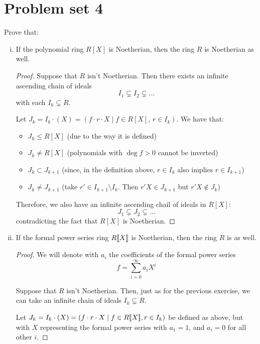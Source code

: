 \section*{Problem set 4}

\begin{problem}
Prove that:
\begin{enumerate}[(i)]
    \item If the polynomial ring \(R[X]\) is Noetherian, then the ring \(R\) is Noetherian as well.
    \begin{proof}
    Suppose that \(R\) isn't Noetherian. Then there exists an infinite ascending chain of ideals
    \[
        I_1 \subsetneq I_2 \subsetneq \dots
    \]
    with each \(I_k \subsetneq R\).
    
    Let \(J_k = I_k \cdot (X) = \left(f \cdot r \cdot X \mid f \in R[X], \, r \in I_k\right)\). We have that:
    \begin{itemize}
        \item \(J_k \leq R[X]\) (due to the way it is defined)
        \item \(J_k \neq R[X]\) (polynomials with \(\deg f > 0\) cannot be inverted)
        \item \(J_k \subset J_{k + 1}\) (since, in the definition above, \(r \in I_k\) also implies \(r \in I_{k + 1}\))
        \item \(J_k \neq J_{k + 1}\) (take \(r' \in I_{k + 1} \setminus I_k\). Then \(r' X \in J_{k + 1}\) but \(r' X \not\in J_k\))
    \end{itemize}
    Therefore, we also have an infinite ascending chail of ideals in \(R[X]\):
    \[
        J_1 \subsetneq J_2 \subsetneq \dots
    \]
    contradicting the fact that \(R[X]\) is Noetherian.
    
    \end{proof}
    
    \item If the formal power series ring \(R [\![X]\!]\) is Noetherian, then the ring \(R\) is as well.
    \begin{proof}
    We will denote with \(a_i\) the coefficients of the formal power series
    \[
        f = \sum_{i = 0}^{\infty} a_i X^i
    \]
    
    Suppose that \(R\) isn't Noetherian. Then, just as for the previous exercise, we can take an infinite chain of ideals \(I_k \subsetneq R\).
    
    Let \(J_k = I_k \cdot (X) = \left(f \cdot r \cdot X \mid f \in R [\![X]\!], r \in I_k\right)\) be defined as above, but with \(X\) representing the formal power series with \(a_1 = 1\), and \(a_i = 0\) for all other \(i\).
    

\end{proof}
\end{enumerate}
\end{problem}
